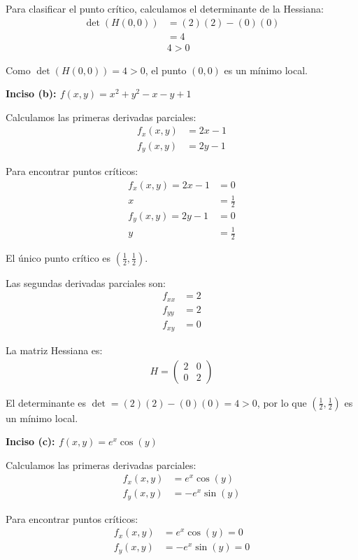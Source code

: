 \documentclass{article}
\begin{document}
Para clasificar el punto crítico, calculamos el determinante de la Hessiana:
\begin{align}
\det(H(0,0)) &= (2)(2) - (0)(0) \\
&= 4 \\
&4>0
\end{align}

Como $\det(H(0,0)) = 4 > 0$, el punto $(0,0)$ es un mínimo local.

\textbf{Inciso (b): $f(x,y) = x^{2} + y^{2} - x - y + 1$}

Calculamos las primeras derivadas parciales:
\begin{align}
f_x(x,y) &= 2x - 1 \\
f_y(x,y) &= 2y - 1
\end{align}

Para encontrar puntos críticos:
\begin{align}
f_x(x,y) = 2x - 1 &= 0 \\
x &= \frac{1}{2} \\
f_y(x,y) = 2y - 1 &= 0 \\
y &= \frac{1}{2}
\end{align}

El único punto crítico es $\left(\frac{1}{2}, \frac{1}{2}\right)$.

Las segundas derivadas parciales son:
\begin{align}
f_{xx} &= 2 \\
f_{yy} &= 2 \\
f_{xy} &= 0
\end{align}

La matriz Hessiana es:
\begin{align}
H = \begin{pmatrix} 2 & 0 \\ 0 & 2 \end{pmatrix}
\end{align}

El determinante es $\det = (2)(2) - (0)(0) = 4 > 0$, por lo que $\left(\frac{1}{2}, \frac{1}{2}\right)$ es un mínimo local.

\textbf{Inciso (c): $f(x,y) = e^{x}\cos(y)$}

Calculamos las primeras derivadas parciales:
\begin{align}
f_x(x,y) &= e^x \cos(y) \\
f_y(x,y) &= -e^x \sin(y)
\end{align}

Para encontrar puntos críticos:
\begin{align}
f_x(x,y) &= e^x \cos(y) = 0 \\
f_y(x,y) &= -e^x \sin(y) = 0
\end{align}
\end{document}
